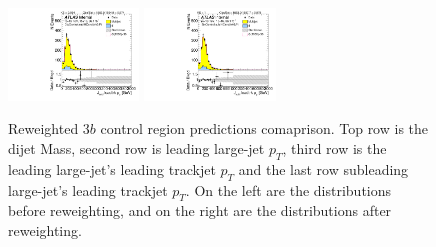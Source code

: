 \begin{figure}[htbp!]
\begin{center}
\includegraphics[width=0.31\textwidth,angle=-90]{figures/boosted/Prereweight/Moriond_ThreeTag_Control_sublHCand_trk0_Pt.pdf}
\includegraphics[width=0.31\textwidth,angle=-90]{figures/boosted/Control/b77_ThreeTag_Control_sublHCand_trk0_Pt.pdf}\\
\caption{Reweighted $3b$ control region predictions comaprison. Top row is the dijet Mass, second row is leading large-\R jet $p_{T}$, third row is the leading large-\R jet's leading trackjet $p_T$ and the last row subleading large-\R jet's leading trackjet $p_T$. On the left are the distributions before reweighting, and on the right are the distributions after reweighting.}
\label{fig:rw-3b-comp-cr}
\end{center}
\end{figure}


